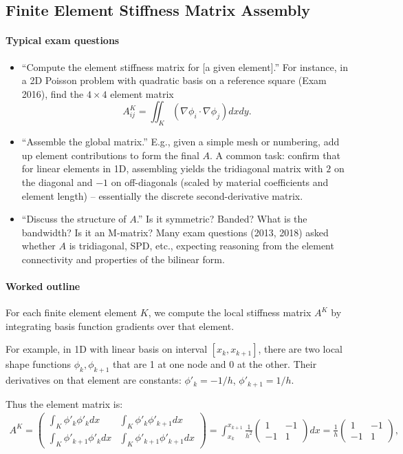 \documentclass[a4paper,11pt]{article}
\begin{document}
\subsection{Finite Element Stiffness Matrix Assembly}
\paragraph{Typical exam questions}
\begin{itemize}
    \item \enquote{Compute the element stiffness matrix for [a given element].}
     For instance, in a 2D Poisson problem with quadratic basis on a reference square (Exam 2016), find the $4\times4$ element matrix 
     $$A^K_{ij} = \iint_K (\nabla \phi_i \cdot \nabla \phi_j)dxdy.$$
    \item \enquote{Assemble the global matrix.}
    E.g., given a simple mesh or numbering, add up element contributions to form the final $A$. A common task: confirm that for linear elements in 1D, assembling yields the tridiagonal matrix with $2$ on the diagonal and $-1$ on off-diagonals (scaled by material coefficients and element length) -- essentially the discrete second-derivative matrix.
    \item \enquote{Discuss the structure of $A$.}
    Is it symmetric? Banded? What is the bandwidth? Is it an M-matrix? Many exam questions (2013, 2018) asked whether $A$ is tridiagonal, SPD, etc., expecting reasoning from the element connectivity and properties of the bilinear form.
\end{itemize}

\paragraph{Worked outline}
For each finite element element $K$, we compute the local stiffness matrix $A^K$ by integrating basis function gradients over that element. 

For example, in 1D with linear basis on interval $[x_k,x_{k+1}]$, there are two local shape functions $\phi_k,\phi_{k+1}$ that are 1 at one node and 0 at the other. Their derivatives on that element are constants: $\phi'_k = -1/h$, $\phi'_{k+1}=1/h$.

Thus the element matrix is:
\begin{align*}
    A^K = \begin{pmatrix}
        \int_K \phi'_k \phi'_kdx    & \int_K \phi'_k \phi'_{k+1}dx    \\[6pt]
        \int_K \phi'_{k+1}\phi'_kdx & \int_K \phi'_{k+1}\phi'_{k+1}dx
    \end{pmatrix} = \int_{x_k}^{x_{k+1}}\frac{1}{h^2} \begin{pmatrix}1 & -1\\ -1 & 1\end{pmatrix} dx = \frac{1}{h}\begin{pmatrix}1 & -1\\ -1 & 1\end{pmatrix},
\end{align*}
\end{document}
